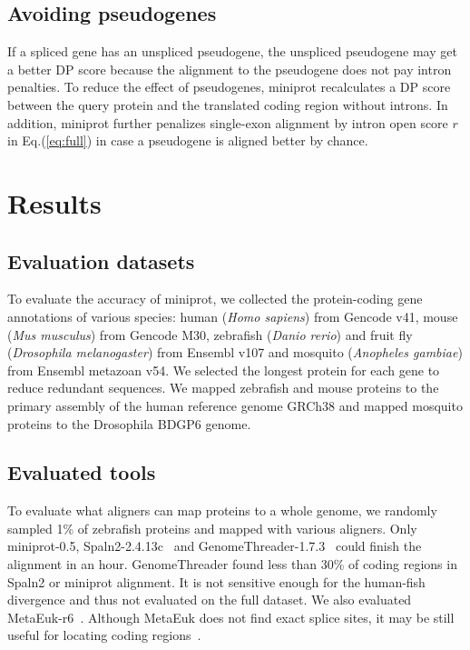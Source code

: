 \documentclass{bioinfo}
\begin{document}
\begin{methods}
\subsection{Avoiding pseudogenes}

If a spliced gene has an unspliced pseudogene, the unspliced pseudogene may get
a better DP score because the alignment to the pseudogene does not pay intron
penalties. To reduce the effect of pseudogenes, miniprot recalculates a DP
score between the query protein and the translated coding region without
introns. In addition, miniprot further penalizes single-exon alignment by
intron open score $r$ in Eq.(\ref{eq:full}) in case a pseudogene is aligned
better by chance.

\end{methods}

\section{Results}

\subsection{Evaluation datasets}

To evaluate the accuracy of miniprot, we collected the protein-coding gene
annotations of various species: human (\emph{Homo sapiens}) from Gencode v41,
mouse (\emph{Mus musculus}) from Gencode M30, zebrafish (\emph{Danio rerio})
and fruit fly (\emph{Drosophila melanogaster}) from Ensembl v107 and mosquito
(\emph{Anopheles gambiae}) from Ensembl metazoan v54. We selected the longest
protein for each gene to reduce redundant sequences. We mapped zebrafish and
mouse proteins to the primary assembly of the human reference genome GRCh38 and
mapped mosquito proteins to the Drosophila BDGP6 genome.

\subsection{Evaluated tools}

To evaluate what aligners can map proteins to a whole genome, we randomly
sampled 1\% of zebrafish proteins and mapped with various aligners. Only
miniprot-0.5, Spaln2-2.4.13c~\citep{Iwata:2012aa} and
GenomeThreader-1.7.3~\citep{DBLP:journals/infsof/GremmeBSK05} could finish the
alignment in an hour.  GenomeThreader found less than 30\% of coding regions in
Spaln2 or miniprot alignment. It is not sensitive enough for the human-fish
divergence and thus not evaluated on the full dataset. We also evaluated
MetaEuk-r6~\citep{Levy-Karin:2020to}. Although MetaEuk does not find exact
splice sites, it may be still useful for locating coding
regions~\citep{Manni:2021ww}.
\end{document}

